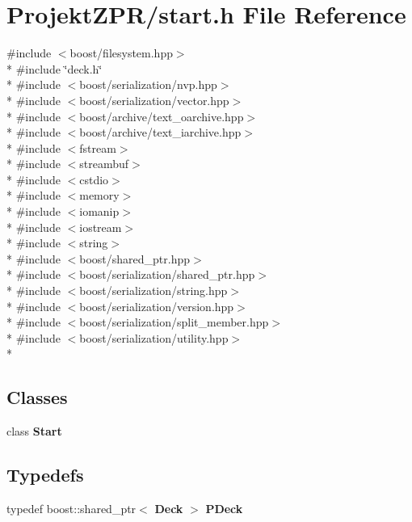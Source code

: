 \section{Projekt\-Z\-P\-R/start.h File Reference}
\label{start_8h}
{\ttfamily \#include $<$boost/filesystem.\-hpp$>$}\\*
{\ttfamily \#include \char`\"{}deck.\-h\char`\"{}}\\*
{\ttfamily \#include $<$boost/serialization/nvp.\-hpp$>$}\\*
{\ttfamily \#include $<$boost/serialization/vector.\-hpp$>$}\\*
{\ttfamily \#include $<$boost/archive/text\-\_\-oarchive.\-hpp$>$}\\*
{\ttfamily \#include $<$boost/archive/text\-\_\-iarchive.\-hpp$>$}\\*
{\ttfamily \#include $<$fstream$>$}\\*
{\ttfamily \#include $<$streambuf$>$}\\*
{\ttfamily \#include $<$cstdio$>$}\\*
{\ttfamily \#include $<$memory$>$}\\*
{\ttfamily \#include $<$iomanip$>$}\\*
{\ttfamily \#include $<$iostream$>$}\\*
{\ttfamily \#include $<$string$>$}\\*
{\ttfamily \#include $<$boost/shared\-\_\-ptr.\-hpp$>$}\\*
{\ttfamily \#include $<$boost/serialization/shared\-\_\-ptr.\-hpp$>$}\\*
{\ttfamily \#include $<$boost/serialization/string.\-hpp$>$}\\*
{\ttfamily \#include $<$boost/serialization/version.\-hpp$>$}\\*
{\ttfamily \#include $<$boost/serialization/split\-\_\-member.\-hpp$>$}\\*
{\ttfamily \#include $<$boost/serialization/utility.\-hpp$>$}\\*
\subsection*{Classes}
\begin{DoxyCompactItemize}
\item 
class {\bf Start}
\end{DoxyCompactItemize}
\subsection*{Typedefs}
\begin{DoxyCompactItemize}
\item 
typedef boost\-::shared\-\_\-ptr$<$ {\bf Deck} $>$ {\bf P\-Deck}
\end{DoxyCompactItemize}


